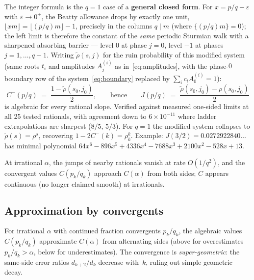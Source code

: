 \documentclass[11pt]{article}
\theoremstyle{definition}
\theoremstyle{remark}
\newcommand{\floor}[1]{\lfloor #1 \rfloor}
\begin{document}
The integer formula is the $q = 1$ case of a \textbf{general closed
form}.
For $x = p/q - \varepsilon$ with $\varepsilon \to 0^+$, the Beatty
allowance drops by exactly one unit, $\floor{x m} = \floor{(p/q)m} - 1$,
precisely in the columns $q \mid m$ (where $\{(p/q)m\} = 0$); the
left limit is therefore the constant of the \emph{same} periodic
Sturmian walk with a sharpened absorbing barrier --- level $0$ at
phase $j = 0$, level $-1$ at phases $j = 1, \ldots, q-1$.
Writing $\tilde\rho(s, j)$ for the ruin probability of this modified
system (same roots $t_i$ and amplitudes $A_j^{(i)}$ as
in~\eqref{eq:amplitudes}, with the phase-$0$ boundary row of the
system~\eqref{eq:boundary} replaced by
$\sum_i c_i A_0^{(i)} = 1$):
\[
C^-(p/q) \;=\; \frac{1 - \tilde\rho(s_0, j_0)}{2},
\qquad\text{hence}\qquad
J(p/q) \;=\; \frac{\tilde\rho(s_0, j_0) - \rho(s_0, j_0)}{2}
\]
is algebraic for every rational slope.
Verified against measured one-sided limits at all 25 tested
rationals, with agreement down to $6 \times 10^{-11}$ where ladder
extrapolations are sharpest ($8/5$, $5/3$).
For $q = 1$ the modified system collapses to
$\tilde\rho(s) = \rho^s$, recovering $1 - 2C^-(k) = \rho_k^k$.
Example: $J(3/2) = 0.0272922840\ldots$ has minimal polynomial
$64x^6 - 896x^5 + 4336x^4 - 7688x^3 + 2100x^2 - 528x + 13$.

At irrational $\alpha$, the jumps of nearby rationals vanish at rate
$O(1/q^2)$, and the convergent values $C(p_k/q_k)$ approach
$C(\alpha)$ from both sides; $C$ appears continuous (no longer
claimed smooth) at irrationals.

\subsection{Approximation by convergents}

For irrational $\alpha$ with continued fraction convergents
$p_k/q_k$, the algebraic values $C(p_k/q_k)$ approximate
$C(\alpha)$ from alternating sides (above for overestimates
$p_k/q_k > \alpha$, below for underestimates).
The convergence is \emph{super-geometric}: the same-side error ratios
$d_{k+2}/d_k$ decrease with~$k$, ruling out simple geometric decay.
\end{document}
